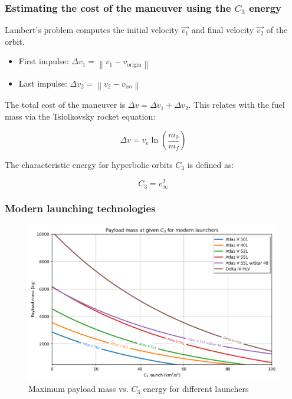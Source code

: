 \documentclass[xcolor={dvipsnames}]{beamer}
\begin{document}
\begin{frame}
\frametitle{Estimating the cost of the maneuver using the $C_3$ energy}

Lambert's problem computes the initial velocity $\vec{v_1}$ and final velocity
$\vec{v_2}$ of the orbit.

\vspace{0.25cm}
    \begin{itemize}
        \item First impulse: $\Delta v_1 = \left \|  v_{1} - v_{\text{origin}} \right \|$
        \item Last impulse: $\Delta v_2 = \left \|  v_{2} - v_{\text{iso}} \right \|$
    \end{itemize}
\vspace{0.25cm}

\pause
The total cost of the maneuver is $\Delta v = \Delta v_1 + \Delta v_2$. This
relates with the fuel mass via the Tsiolkovsky rocket equation:

$$ \Delta v = v_{e} \ln \left( \frac{m_0}{m_f} \right) $$

\pause
\vspace{0.25cm}
The characteristic energy for hyperbolic orbits $C_3$ is defined as:

$$ C_3 = v_{\infty}^2 $$

\end{frame}

\begin{frame}
\frametitle{Modern launching technologies}

\begin{figure}[h]
    \centering
    \includegraphics[width=\textwidth]{fig/static/payload_vs_c3.png}
    \caption{Maximum payload mass vs. $C_3$ energy for different launchers}
    \label{fig:payload_vs_c3}
\end{figure}

\end{frame}
\end{document}
